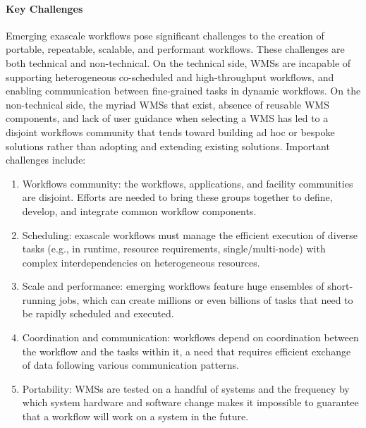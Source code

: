 \paragraph{Key Challenges}
Emerging exascale workflows pose significant challenges to the creation of
portable, repeatable, scalable, and performant workflows. These challenges are both
technical and non-technical. On the technical side, WMSs are 
incapable of supporting heterogeneous co-scheduled and
high-throughput workflows, and enabling communication between fine-grained
tasks in dynamic workflows. On the non-technical side, the myriad WMSs
that exist, absence of reusable WMS components, and lack of user
guidance when selecting a WMS has led to a disjoint workflows community
that tends toward building ad hoc or bespoke solutions rather than adopting
and extending existing solutions. Important challenges include: 
\begin{enumerate}
    \item Workflows community: the workflows, applications, and facility communities are disjoint. 
    Efforts are needed to bring these groups together to define, develop, and integrate common workflow components. %
    \item Scheduling: exascale workflows must manage the efficient execution of diverse
    tasks (e.g., in runtime, resource requirements, single/multi-node) with complex interdependencies on heterogeneous resources. 
    \item Scale and performance: emerging workflows feature huge ensembles of short-running jobs, 
    which can create millions or even billions of tasks that need to be rapidly scheduled and executed.
    \item Coordination and communication: workflows depend on coordination between the workflow and 
    the tasks within it, a need that requires efficient exchange of data following various communication patterns.
    \item Portability: WMSs are tested on a handful of systems and the frequency by which
    system hardware and software change makes it impossible to guarantee that a workflow will work on a system in the future.
\end{enumerate}

